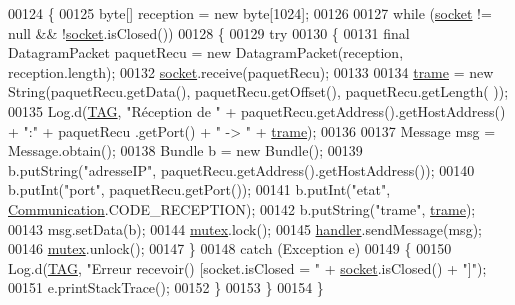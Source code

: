 \begin{DoxyCode}
00124     \{
00125         byte[] reception = \textcolor{keyword}{new} byte[1024];
00126 
00127         \textcolor{keywordflow}{while} (\hyperlink{classcom_1_1lasalle_1_1meeting_1_1_communication_a2a538f36640aecebbb833bbaf1f03858}{socket} != null && !\hyperlink{classcom_1_1lasalle_1_1meeting_1_1_communication_a2a538f36640aecebbb833bbaf1f03858}{socket}.isClosed())
00128         \{
00129             \textcolor{keywordflow}{try}
00130             \{
00131                 \textcolor{keyword}{final} DatagramPacket paquetRecu = \textcolor{keyword}{new} DatagramPacket(reception, reception.length);
00132                 \hyperlink{classcom_1_1lasalle_1_1meeting_1_1_communication_a2a538f36640aecebbb833bbaf1f03858}{socket}.receive(paquetRecu);
00133 
00134                 \hyperlink{classcom_1_1lasalle_1_1meeting_1_1_communication_a1c5c3782ce80717dab95ed5335929333}{trame} = \textcolor{keyword}{new} String(paquetRecu.getData(), paquetRecu.getOffset(), paquetRecu.getLength(
      ));
00135                 Log.d(\hyperlink{classcom_1_1lasalle_1_1meeting_1_1_communication_a5d58f88df1f20b4d61edbed9a82eccab}{TAG}, \textcolor{stringliteral}{"Réception de "} + paquetRecu.getAddress().getHostAddress() + \textcolor{stringliteral}{":"} + paquetRecu
      .getPort() + \textcolor{stringliteral}{" -> "} + \hyperlink{classcom_1_1lasalle_1_1meeting_1_1_communication_a1c5c3782ce80717dab95ed5335929333}{trame});
00136 
00137                 Message msg = Message.obtain();
00138                 Bundle b = \textcolor{keyword}{new} Bundle();
00139                 b.putString(\textcolor{stringliteral}{"adresseIP"}, paquetRecu.getAddress().getHostAddress());
00140                 b.putInt(\textcolor{stringliteral}{"port"}, paquetRecu.getPort());
00141                 b.putInt(\textcolor{stringliteral}{"etat"}, \hyperlink{classcom_1_1lasalle_1_1meeting_1_1_communication_a3d73554b2774d3274ad385b0faa27d14}{Communication}.CODE\_RECEPTION);
00142                 b.putString(\textcolor{stringliteral}{"trame"}, \hyperlink{classcom_1_1lasalle_1_1meeting_1_1_communication_a1c5c3782ce80717dab95ed5335929333}{trame});
00143                 msg.setData(b);
00144                 \hyperlink{classcom_1_1lasalle_1_1meeting_1_1_communication_af123afba8dcddc259017fb5c3b431dab}{mutex}.lock();
00145                 \hyperlink{classcom_1_1lasalle_1_1meeting_1_1_communication_a05fa5f360f28819a9e106e0265a74643}{handler}.sendMessage(msg);
00146                 \hyperlink{classcom_1_1lasalle_1_1meeting_1_1_communication_af123afba8dcddc259017fb5c3b431dab}{mutex}.unlock();
00147             \}
00148             \textcolor{keywordflow}{catch} (Exception e)
00149             \{
00150                 Log.d(\hyperlink{classcom_1_1lasalle_1_1meeting_1_1_communication_a5d58f88df1f20b4d61edbed9a82eccab}{TAG}, \textcolor{stringliteral}{"Erreur recevoir() [socket.isClosed = "} + \hyperlink{classcom_1_1lasalle_1_1meeting_1_1_communication_a2a538f36640aecebbb833bbaf1f03858}{socket}.isClosed() + \textcolor{stringliteral}{"]"});
00151                 e.printStackTrace();
00152             \}
00153         \}
00154     \}
\end{DoxyCode}
